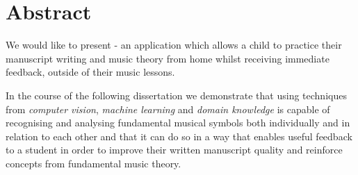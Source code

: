 \chapter*{Abstract}
We would like to present \noteED - an application which allows a child to practice their manuscript writing and music theory from home whilst receiving immediate feedback, outside of their music lessons.

In the course of the following dissertation we demonstrate that using techniques from \emph{computer vision}, \emph{machine learning} and \emph{domain knowledge} \noteED is capable of recognising and analysing fundamental musical symbols both individually and in relation to each other and that it can do so in a way that enables useful feedback to a student in order to improve their written manuscript quality and reinforce concepts from fundamental music theory.

